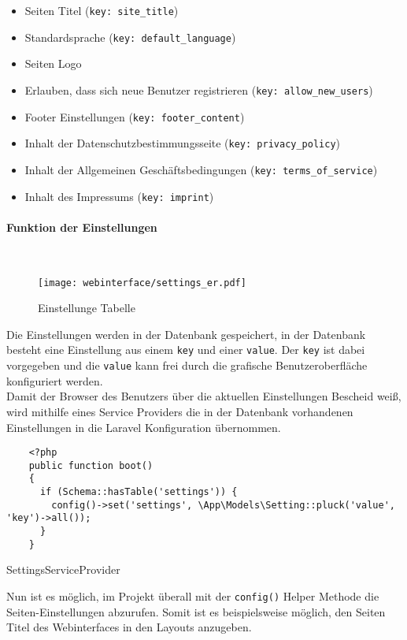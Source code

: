 \begin{itemize}
  \item Seiten Titel (\verb|key: site_title|)
  \item Standardsprache (\verb|key: default_language|)
  \item Seiten Logo
  \item Erlauben, dass sich neue Benutzer registrieren (\verb|key: allow_new_users|)
  \item Footer Einstellungen (\verb|key: footer_content|)
  \item Inhalt der Datenschutzbestimmungsseite (\verb|key: privacy_policy|)
  \item Inhalt der Allgemeinen Geschäftsbedingungen (\verb|key: terms_of_service|)
  \item Inhalt des Impressums (\verb|key: imprint|)
\end{itemize}

\paragraph{Funktion der Einstellungen}\mbox{}\\

\begin{figure}[H]
  \centering
  \texttt{[image: webinterface/settings\_er.pdf]}
  \caption{Einstellunge Tabelle}
\end{figure}

Die Einstellungen werden in der Datenbank gespeichert, in der Datenbank besteht eine Einstellung
aus einem \verb|key| und einer \verb|value|. Der \verb|key| ist dabei vorgegeben und
die \verb|value| kann frei durch die grafische Benutzeroberfläche konfiguriert werden.\\

Damit der Browser des Benutzers über die aktuellen Einstellungen Bescheid weiß,
wird mithilfe eines Service Providers die in der Datenbank vorhandenen
Einstellungen in die Laravel Konfiguration übernommen.

\begin{listing}[H]
  \begin{verbatim}
    <?php
    public function boot()
    {
      if (Schema::hasTable('settings')) {
        config()->set('settings', \App\Models\Setting::pluck('value', 'key')->all());
      }
    }
  \end{verbatim}
  \caption{SettingsServiceProvider}
\end{listing}

Nun ist es möglich, im Projekt überall mit der \verb|config()| Helper Methode die
Seiten-Einstellungen abzurufen. Somit ist es beispielsweise möglich, den Seiten
Titel des Webinterfaces in den Layouts anzugeben.

